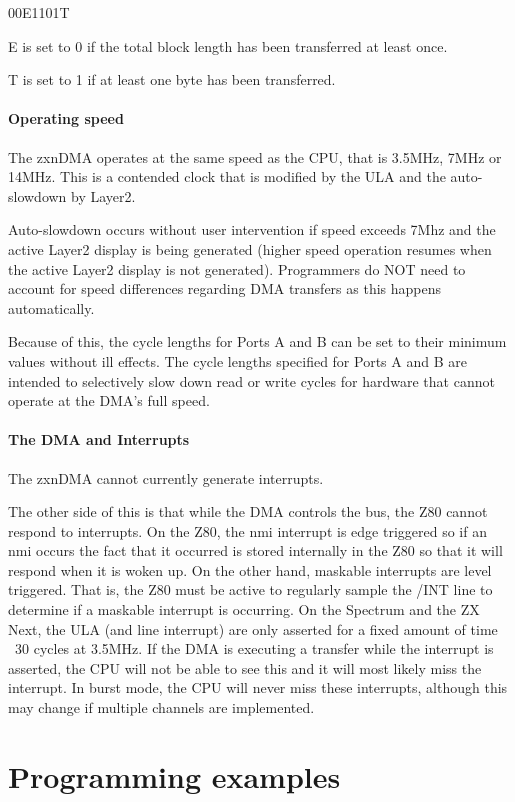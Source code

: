 00E1101T

E is set to 0 if the total block length has been transferred
at least once.

T is set to 1 if at least one byte has been transferred.

\paragraph{Operating speed}

The zxnDMA operates at the same speed as the CPU, that is 3.5MHz, 7MHz
or 14MHz. This is a contended clock that is modified by the ULA and
the auto-slowdown by Layer2.

Auto-slowdown occurs without user intervention if speed exceeds 7Mhz
and the active Layer2 display is being generated (higher speed
operation resumes when the active Layer2 display is not
generated). Programmers do NOT need to account for speed differences
regarding DMA transfers as this happens automatically.

Because of this, the cycle lengths for Ports A and B can be set to
their minimum values without ill effects. The cycle lengths specified
for Ports A and B are intended to selectively slow down read or write
cycles for hardware that cannot operate at the DMA's full speed.

\paragraph{The DMA and Interrupts}

The zxnDMA cannot currently generate interrupts.

The other side of this is that while the DMA controls the bus, the Z80
cannot respond to interrupts. On the Z80, the nmi interrupt is edge
triggered so if an nmi occurs the fact that it occurred is stored
internally in the Z80 so that it will respond when it is woken up. On
the other hand, maskable interrupts are level triggered. That is, the
Z80 must be active to regularly sample the /INT line to determine if a
maskable interrupt is occurring. On the Spectrum and the ZX Next, the
ULA (and line interrupt) are only asserted for a fixed amount of time
~30 cycles at 3.5MHz. If the DMA is executing a transfer while the
interrupt is asserted, the CPU will not be able to see this and it
will most likely miss the interrupt. In burst mode, the CPU will never
miss these interrupts, although this may change if multiple channels
are implemented.

\section{Programming examples}

